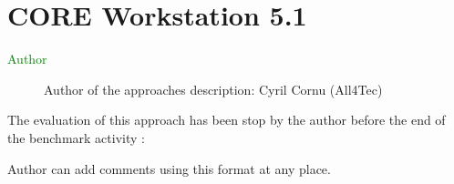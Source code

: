 \chapter{CORE Workstation 5.1}

\begin{description}
\item[\textcolor{green}{Author}] Author of the approaches description: Cyril Cornu (All4Tec)
\end{description}


The evaluation of this approach has been stop by the author before the end of the benchmark activity :


\begin{author_comment}
Author can add comments using this format at any place.
\end{author_comment}

